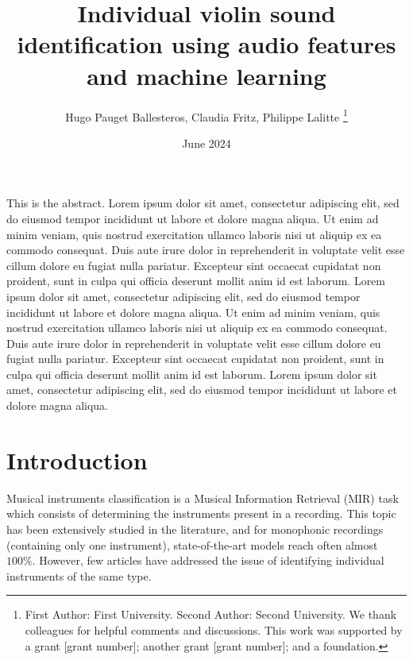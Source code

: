 \documentclass[letterpaper,11pt,leqno]{article}
\begin{document}
\title{Individual violin sound identification using audio features and machine learning}

\author{Hugo Pauget Ballesteros, Claudia Fritz, Philippe Lalitte
%
\thanks{First Author: First University. Second Author: Second University. We thank colleagues for helpful comments and discussions. This work was supported by a grant [grant number]; another grant [grant number]; and a foundation.}}

\date{June 2024}   

\begin{titlepage}
\maketitle

This is the abstract. Lorem ipsum dolor sit amet, consectetur adipiscing elit, sed do eiusmod tempor incididunt ut labore et dolore magna aliqua. Ut enim ad minim veniam, quis nostrud exercitation ullamco laboris nisi ut aliquip ex ea commodo consequat. Duis aute irure dolor in reprehenderit in voluptate velit esse cillum dolore eu fugiat nulla pariatur. Excepteur sint occaecat cupidatat non proident, sunt in culpa qui officia deserunt mollit anim id est laborum. Lorem ipsum dolor sit amet, consectetur adipiscing elit, sed do eiusmod tempor incididunt ut labore et dolore magna aliqua. Ut enim ad minim veniam, quis nostrud exercitation ullamco laboris nisi ut aliquip ex ea commodo consequat. Duis aute irure dolor in reprehenderit in voluptate velit esse cillum dolore eu fugiat nulla pariatur. Excepteur sint occaecat cupidatat non proident, sunt in culpa qui officia deserunt mollit anim id est laborum. Lorem ipsum dolor sit amet, consectetur adipiscing elit, sed do eiusmod tempor incididunt ut labore et dolore magna aliqua.

\end{titlepage}

\section{Introduction}\label{s:introduction}
 
Musical instruments classification is a Musical Information Retrieval (MIR) task which consists of determining the instruments present in a recording. This topic has been extensively studied in the literature, and for monophonic recordings (containing only one instrument), state-of-the-art models reach often almost $100\%$. However, few articles have addressed the issue of identifying individual instruments of the same type.
\end{document}
